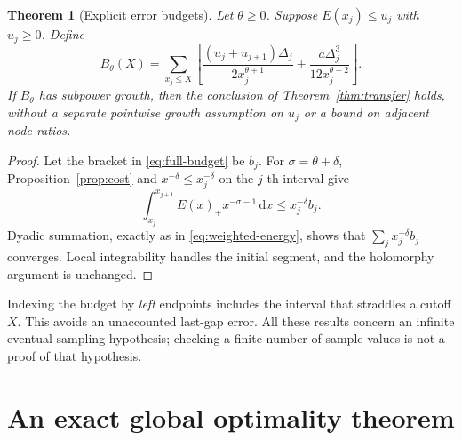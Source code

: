\documentclass[11pt]{article}
\newtheorem{theorem}{Theorem}[section]
\theoremstyle{definition}
\newcommand{\dd}{\,\mathrm d}
\begin{document}
\begin{theorem}[Explicit error budgets]\label{thm:errors}
Let \(\theta\geq0\). Suppose \(E(x_j)\leq u_j\) with \(u_j\geq0\).
Define
\begin{equation}\label{eq:full-budget}
 B_\theta(X)=\sum_{x_j\leq X}
 \left[\frac{(u_j+u_{j+1})\Delta_j}{2x_j^{\theta+1}}
        +\frac{a\Delta_j^3}{12x_j^{\theta+2}}\right].
\end{equation}
If \(B_\theta\) has subpower growth, then the conclusion of
Theorem~\ref{thm:transfer} holds, without a separate pointwise growth
assumption on \(u_j\) or a bound on adjacent node ratios.
\end{theorem}
\begin{proof}
Let the bracket in \eqref{eq:full-budget} be \(b_j\). For
\(\sigma=\theta+\delta\), Proposition~\ref{prop:cost} and
\(x^{-\delta}\leq x_j^{-\delta}\) on the \(j\)-th interval give
\[
 \int_{x_j}^{x_{j+1}}E(x)_+x^{-\sigma-1}\dd x
 \leq x_j^{-\delta}b_j.
\]
Dyadic summation, exactly as in \eqref{eq:weighted-energy}, shows that
\(\sum_jx_j^{-\delta}b_j\) converges. Local integrability handles the
initial segment, and the holomorphy argument is unchanged.
\end{proof}

Indexing the budget by \emph{left} endpoints includes the interval that
straddles a cutoff \(X\). This avoids an unaccounted last-gap error.
All these results concern an infinite eventual sampling hypothesis;
checking a finite number of sample values is not a proof of that
hypothesis.

\section{An exact global optimality theorem}
\label{sec:optimality}
\end{document}
